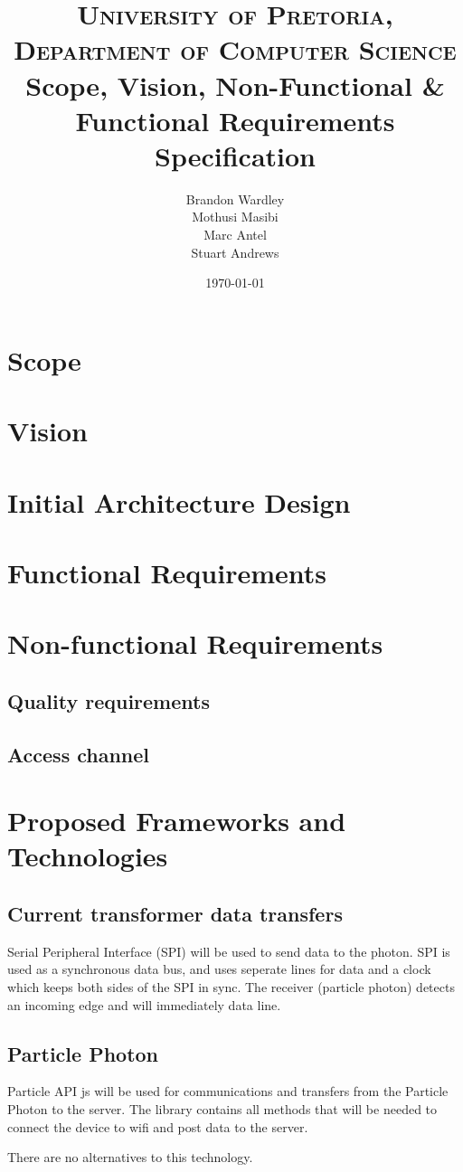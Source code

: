 \documentclass[paper=a4, fontsize=11pt]{scrartcl} %
\title {
	\normalfont \normalsize 
	\textsc{University of Pretoria, Department of Computer Science} \\ [25pt]
	\huge Scope, Vision, Non-Functional \& Functional Requirements Specification\\
}
\author {
	Brandon Wardley  \\
	Mothusi Masibi \\
	Marc Antel \\
	Stuart Andrews \\
}
\date{\normalsize\today} %
\begin{document}
	\maketitle %
	\newpage
	\section{Scope}
	\newpage
	\section{Vision}
	\newpage
	\section{Initial Architecture Design}
	\newpage
	\section{Functional Requirements}
	\newpage
	\section{Non-functional Requirements}
	\subsection{Quality requirements}
	\paragraph{}
	\subsection{Access channel}
	\newpage
	\section{Proposed Frameworks and Technologies}
	\subsection{Current transformer data transfers}
	Serial Peripheral Interface (SPI) will be used to send data to the photon. SPI is used as a synchronous data bus,
	and uses seperate lines for data and a clock which keeps both sides of the SPI in sync. The receiver (particle photon) detects an incoming 
	edge and will immediately data line. 
	\subsection{Particle Photon}
	Particle API js will be used for communications and transfers from the Particle Photon to the server. The library contains all
	methods that will be needed to connect the device to wifi and post data to the server.
	
	There are no alternatives to this technology.
\end{document}
